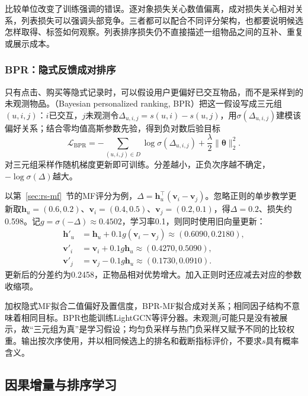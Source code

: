 比较单位改变了训练强调的错误。逐对象损失关心数值偏离，成对损失关心相对关系，列表损失可以强调头部竞争。三者都可以配合不同评分架构，也都要说明候选怎样取得、标签如何观察。列表排序损失仍不直接描述一组物品之间的互补、重复或展示成本。

\subsubsection{BPR：隐式反馈成对排序}
\label{sec:rs-bpr}

只有点击、购买等隐式记录时，可以假设用户更偏好已交互物品，而不是采样到的未观测物品。（Bayesian personalized ranking, BPR）把这一假设写成三元组$(u,i,j)$：$i$已交互，$j$未观测令$\Delta_{u,i,j}=s(u,i)-s(u,j)$，用$\sigma(\Delta_{u,i,j})$建模该偏好关系；结合零均值高斯参数先验，得到负对数后验目标
\begin{equation}
 \mathcal L_{\mathrm{BPR}}
 =-\sum_{(u,i,j)\in D}\log\sigma(\Delta_{u,i,j})
  +\frac{\lambda}{2}\lVert\bm\theta\rVert_2^2.
 \label{eq:rs-bpr}
\end{equation}
对三元组采样作随机梯度更新即可训练。分差越小，正负次序越不确定，$-\log\sigma(\Delta)$越大。

以第~\ref{sec:rs-mf}~节的MF评分为例，$\Delta=\bm h_u^\top(\bm v_i-\bm v_j)$。忽略正则的单步教学更新取$\bm h_u=(0.6,0.2)$、$\bm v_i=(0.4,0.5)$、$\bm v_j=(0.2,0.1)$，得$\Delta=0.2$、损失约0.598。记$g=\sigma(-\Delta)\approx0.4502$，学习率0.1，则同时使用旧向量更新：
\begin{align}
 \bm h'_u&=\bm h_u+0.1g(\bm v_i-\bm v_j)
           \approx(0.6090,0.2180),\\
 \bm v'_i&=\bm v_i+0.1g\bm h_u\approx(0.4270,0.5090),\\
 \bm v'_j&=\bm v_j-0.1g\bm h_u\approx(0.1730,0.0910).
\end{align}
更新后的分差约为0.2458，正物品相对优势增大。加入正则时还应减去对应的参数收缩项。

加权隐式MF拟合二值偏好及置信度，BPR-MF拟合成对关系；相同因子结构不意味着相同目标。BPR也能训练LightGCN等评分器。未观测$j$可能只是没有被展示，故“三元组为真”是学习假设；均匀负采样与热门负采样又赋予不同的比较权重。输出按次序使用，并以相同候选上的排名和截断指标评价，不要求$s$具有概率含义。

\subsection{因果增量与排序学习}
\label{sec:rs-uplift-ranking}

